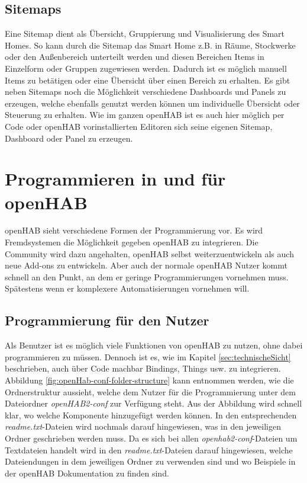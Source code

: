 \subsection{Sitemaps}
Eine Sitemap dient als Übersicht, Gruppierung und Visualisierung des Smart Homes. So kann durch die Sitemap das Smart Home z.B. in Räume, Stockwerke oder den Außenbereich unterteilt werden und diesen Bereichen Items in Einzelform oder Gruppen zugewiesen werden. Dadurch ist es möglich manuell Items zu betätigen oder eine Übersicht über einen Bereich zu erhalten. Es gibt neben Sitemaps noch die Möglichkeit verschiedene Dashboards und Panels zu erzeugen, welche ebenfalls genutzt werden können um individuelle Übersicht oder Steuerung zu erhalten.
Wie im ganzen openHAB ist es auch hier möglich per Code oder openHAB vorinstallierten Editoren sich seine eigenen Sitemap, Dashboard oder Panel zu erzeugen.

\section{Programmieren in und für openHAB} \label{sec:custom-development}
openHAB sieht verschiedene Formen der Programmierung vor. Es wird Fremdsystemen die Möglichkeit gegeben openHAB zu integrieren. Die Community wird dazu angehalten, openHAB selbst weiterzuentwickeln als auch neue Add-ons zu entwickeln. Aber auch der normale openHAB Nutzer kommt schnell an den Punkt, an dem er geringe Programmierungen vornehmen muss. Spätestens wenn er komplexere Automatisierungen vornehmen will.

\subsection{Programmierung für den Nutzer}
Als Benutzer ist es möglich viele Funktionen von openHAB zu nutzen, ohne dabei programmieren zu müssen. Dennoch ist es, wie im Kapitel \ref{sec:technischeSicht} beschrieben, auch über Code machbar Bindings, Things usw. zu integrieren. Abbildung \ref{fig:openHab-conf-folder-structure} kann entnommen werden, wie die Ordnerstruktur aussieht, welche dem Nutzer für die Programmierung unter dem Dateiordner \textit{openHAB2-conf} zur Verfügung steht. Aus der Abbildung wird schnell klar, wo welche Komponente hinzugefügt werden können. In den entsprechenden \textit{readme.txt}-Dateien wird nochmals darauf hingewiesen, was in den jeweiligen Ordner geschrieben werden muss. Da es sich bei allen \textit{openhab2-conf}-Dateien um Textdateien handelt wird in den \textit{readme.txt}-Dateien darauf hingewiesen, welche Dateiendungen in dem jeweiligen Ordner zu verwenden sind und wo Beispiele in der openHAB Dokumentation zu finden sind.

